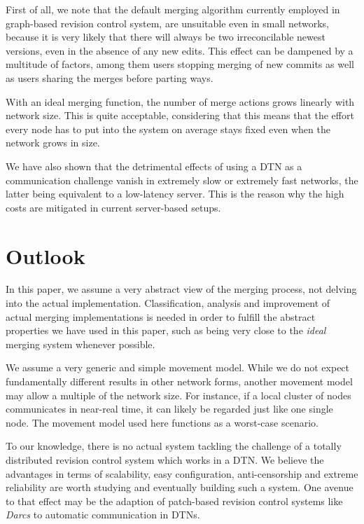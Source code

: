 \documentclass[conference,a4paper]{IEEEtran}
\begin{document}
First of all, we note that the default merging algorithm currently employed in graph-based revision control system, are unsuitable even in small networks, because it is very likely that there will always be two irreconcilable newest versions, even in the absence of any new edits. This effect can be dampened by a multitude of factors, among them users stopping merging of new commits as well as users sharing the merges before parting ways.

With an ideal merging function, the number of merge actions grows linearly with network size. This is quite acceptable, considering that this means that the effort every node has to put into the system on average stays fixed even when the network grows in size.

We have also shown that the detrimental effects of using a DTN as a communication challenge vanish in extremely slow or extremely fast networks, the latter being equivalent to a low-latency server. This is the reason why the high costs are mitigated in current server-based setups.

\section{Outlook}

In this paper, we assume a very abstract view of the merging process, not delving into the actual implementation. Classification, analysis and improvement of actual merging implementations is needed in order to fulfill the abstract properties we have used in this paper, such as being very close to the \textit{ideal} merging system whenever possible.

We assume a very generic and simple movement model. While we do not expect fundamentally different results in other network forms, another movement model may allow a multiple of the network size. For instance, if a local cluster of nodes communicates in near-real time, it can likely be regarded just like one single node. The movement model used here functions as a worst-case scenario.

To our knowledge, there is no actual system tackling the challenge of a totally distributed revision control system which works in a DTN. We believe the advantages in terms of scalability, easy configuration, anti-censorship and extreme reliability are worth studying and eventually building such a system. One avenue to that effect may be the adaption of patch-based revision control systems like \textit{Darcs}\cite{roundy2005darcs} to automatic communication in DTNs.
\end{document}
